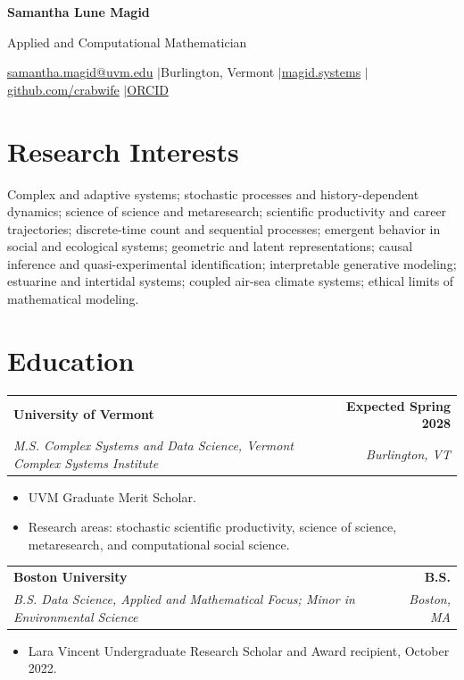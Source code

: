 \documentclass[10pt,letterpaper]{article}
\makeatletter
\newcommand{\entry}[4]{%
  \begin{tabularx}{\textwidth}{@{}Xr@{}}
    \textbf{#1} & \textbf{#2} \\
    \textit{#3} & \textit{#4}
  \end{tabularx}\vspace{-2pt}
}
\makeatother
\begin{document}
\begin{center}
  {\LARGE\bfseries\color{burgundy} Samantha Lune Magid}\par
  \vspace{2pt}
  Applied and Computational Mathematician\par
  \vspace{3pt}
  \href{mailto:samantha.magid@uvm.edu}{samantha.magid@uvm.edu}
  \enspace$\vert$\enspace Burlington, Vermont
  \enspace$\vert$\enspace \href{https://magid.systems}{magid.systems}
  \enspace$\vert$\enspace \href{https://github.com/crabwife}{github.com/crabwife}
  \enspace$\vert$\enspace \href{https://orcid.org/0009-0004-0358-4870}{ORCID}
\end{center}

\section*{Research Interests}
Complex and adaptive systems; stochastic processes and history-dependent dynamics; science of science and metaresearch; scientific productivity and career trajectories; discrete-time count and sequential processes; emergent behavior in social and ecological systems; geometric and latent representations; causal inference and quasi-experimental identification; interpretable generative modeling; estuarine and intertidal systems; coupled air-sea climate systems; ethical limits of mathematical modeling.

\section*{Education}
\entry{University of Vermont}{Expected Spring 2028}{M.S. Complex Systems and Data Science, Vermont Complex Systems Institute}{Burlington, VT}
\begin{itemize}
  \item UVM Graduate Merit Scholar.
  \item Research areas: stochastic scientific productivity, science of science, metaresearch, and computational social science.
\end{itemize}

\entry{Boston University}{B.S.}{B.S. Data Science, Applied and Mathematical Focus; Minor in Environmental Science}{Boston, MA}
\begin{itemize}
  \item Lara Vincent Undergraduate Research Scholar and Award recipient, October 2022.
\end{itemize}
\end{document}
